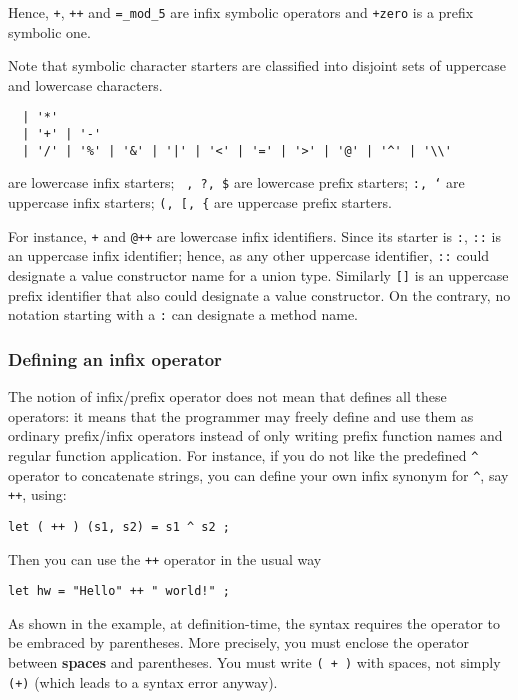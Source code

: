 Hence, {\tt +}, {\tt ++} and {\tt =\_mod\_5} are infix symbolic operators and
{\tt \tilde+zero} is a prefix symbolic one.

Note that symbolic character starters are classified into disjoint sets of uppercase
and lowercase characters.
\begin{verbatim}
  | '*'
  | '+' | '-'
  | '/' | '%' | '&' | '|' | '<' | '=' | '>' | '@' | '^' | '\\'
\end{verbatim}
are lowercase infix starters;
{\tt ~, ?, \$}
are lowercase prefix starters;
{\tt :, `}
are uppercase infix starters;
{\tt (, [, \{}
are uppercase prefix starters.

For instance, {\tt +} and {\tt @++} are lowercase infix identifiers.
Since its starter is {\tt :}, {\tt ::} is an uppercase infix identifier; hence,
as any other uppercase identifier, {\tt ::} could designate a
value constructor name for a union type. Similarly {\tt []} is an uppercase prefix identifier that also
could designate a value constructor.
On the contrary, no notation starting with a {\tt :} can designate a method name.

\subsubsection{Defining an infix operator}

The notion of infix/prefix operator does not mean that {\focal} defines all
these operators: it means that the programmer may freely define and use them
as ordinary prefix/infix operators instead of only writing prefix function
names and regular function application. For instance, if you do not like the
{\focal} predefined \verb"^" operator to concatenate strings, you can define your
own infix synonym for \verb"^", say {\tt ++}, using:

{\scriptsize
\begin{lstlisting}
let ( ++ ) (s1, s2) = s1 ^ s2 ;
\end{lstlisting}
}
Then you can use the {\tt ++} operator in the usual way
{\scriptsize
\begin{lstlisting}
let hw = "Hello" ++ " world!" ;
\end{lstlisting}
}

As shown in the example, at definition-time, the syntax requires
the operator to be embraced by parentheses. More precisely, you must
enclose the operator between {\bf spaces} and parentheses.
You must write {\tt ( + )} with spaces, not simply {\tt (+)} (which leads
to a syntax error anyway).

